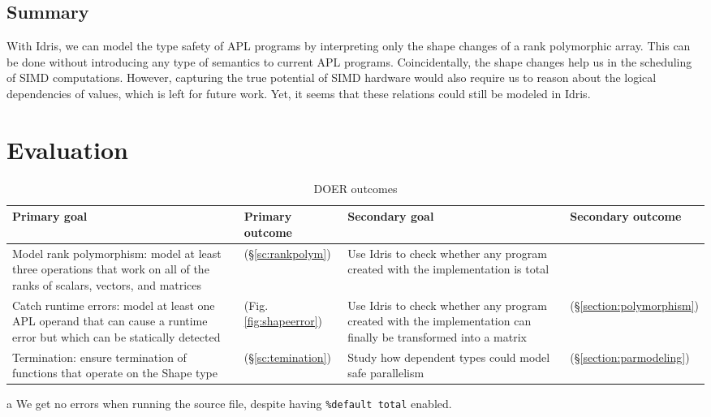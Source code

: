 \documentclass{report}
\newcommand{\cmark}{\ding{51}}
\begin{document}
\section*{Summary}

With Idris, we can model the type safety of APL programs by interpreting only the shape changes of a rank polymorphic array. This can be done without introducing any type of semantics to current APL programs. Coincidentally, the shape changes help us in the scheduling of SIMD computations. However, capturing the true potential of SIMD hardware would also require us to reason about the logical dependencies of values, which is left for future work. Yet, it seems that these relations could still be modeled in Idris.

\chapter{Evaluation}
\label{ch:evaluation}

\begin{table}
\begin{center}
\begin{threeparttable}[b]
\caption{DOER outcomes}
\label{fig:doer}
\begin{tabular}{|p{4cm}|p{2cm}|p{4cm}|p{2cm}|}
\hline
Primary goal
& Primary outcome
& Secondary goal
& Secondary outcome
\\
\hline
Model rank polymorphism: model at least three operations that work on all of the ranks of scalars, vectors, and matrices
& \cmark (§\ref{sc:rankpolym})
& Use Idris to check whether any program created with the implementation is total
& \cmark\tnote{a}
\\
\hline
Catch runtime errors: model at least one APL operand that can cause a runtime error but which can be statically detected
& \cmark (Fig. \ref{fig:shapeerror})
& Use Idris to check whether any program created with the implementation can finally be transformed into a matrix
& \cmark (§\ref{section:polymorphism})
\\
\hline
Termination: ensure termination of functions that operate on the Shape type
& \cmark (§\ref{sc:temination})
& Study how dependent types could model safe parallelism
& \cmark (§\ref{section:parmodeling})
\\
\hline
\end{tabular}
    \begin{tablenotes}
    \item [a] We get no errors when running the source file, despite having \verb|%default total| enabled.
    \end{tablenotes}
    \end{threeparttable}
\end{center}
\end{table}
\end{document}
